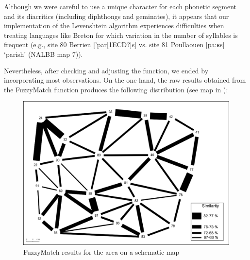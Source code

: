 \documentclass[output=paper]{LSP/langsci}
\begin{document}
\begin{table}
\caption{Examples of the difficulties encountered by DL for the concept 'that one (masc.)'}
\label{tab:3}
\end{table}

Although we were careful to use a unique character for each phonetic segment and its diacritics (including diphthongs and geminates), it appears that our implementation of the Levenshtein algorithm experiences difficulties when treating languages like Breton for which variation in the number of syllables is frequent (e.g., site 80 Berrien ['par[1ECD?]s] vs. site 81 Poullaouen [pa:ʀs] ‘parish’ (NALBB map 7)).

Nevertheless, after checking and adjusting the function, we ended by incorporating most observations. On the one hand, the raw results obtained from the FuzzyMatch function produces the following distribution (see map in ):

\begin{figure}
\includegraphics[width=\textwidth]{illustrations/brun_etal_fig3}
\caption{\textup{FuzzyMatch results for the area on a schematic map}}
\label{fig:3}
\end{figure}
\end{document}
